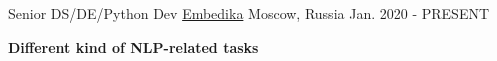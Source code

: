 \begin{cventries}
\cventry
{Senior DS/DE/Python Dev} %
{\href{https://embedika.ru/}{Embedika}} %
{Moscow, Russia} %
{Jan. 2020 - PRESENT} %
{ %
\begin{cvitems}
\item {\textbf{Different kind of NLP-related tasks}}
\end{cvitems}
}



\end{cventries}